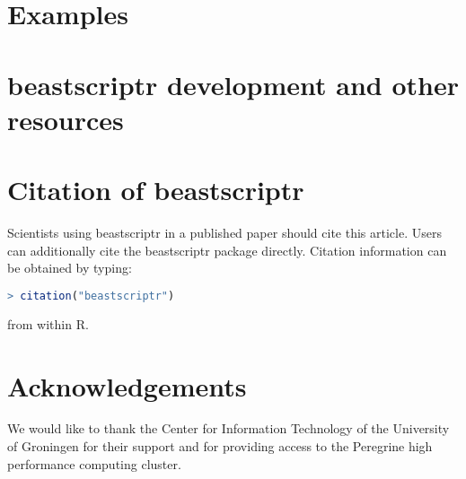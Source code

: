 \documentclass{article}
\begin{document}
\section{Examples}

\section{beastscriptr development and other resources}

\section{Citation of beastscriptr}

Scientists using beastscriptr in a published paper should cite this
article. Users can additionally cite the beastscriptr package 
directly. Citation information can be obtained by typing:

\begin{lstlisting}[language=R]
> citation("beastscriptr")
\end{lstlisting}

from within R.

\section*{Acknowledgements}

We would like to thank the Center for Information Technology of the University of Groningen for their support
and for providing access to the Peregrine high performance computing cluster.









\appendix
\end{document}
